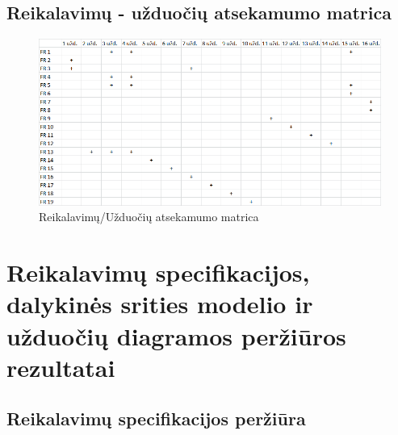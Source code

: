 \documentclass[oneside]{VUMIFPSkursinis}
\begin{document}
\subsection{Reikalavimų - užduočių atsekamumo matrica}
\begin{figure}[h]
    \centering
    \includegraphics[width=1\textwidth]{reik_uzd_matrica_before.png}
    \caption{Reikalavimų/Užduočių atsekamumo matrica}
    \label{fig:matrica}
\end{figure}

\section{Reikalavimų specifikacijos, dalykinės srities modelio ir užduočių diagramos peržiūros rezultatai}
\subsection{Reikalavimų specifikacijos peržiūra}
\end{document}
